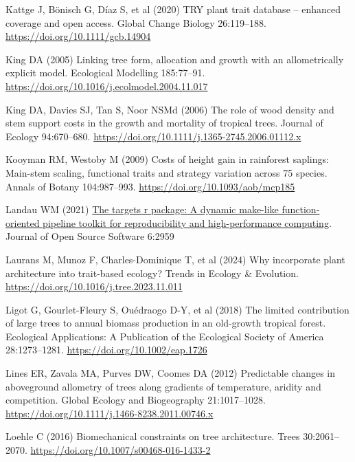 \documentclass[
  12pt,
  letterpaper,
  DIV=11,
  numbers=noendperiod]{scrartcl}
\newlength{\cslhangindent}
\newlength{\cslentryspacingunit} %
\newenvironment{CSLReferences}[2] %
 {%
  \setlength{\parindent}{0pt}
  \ifodd #1
  \let\oldpar\par
  \def\par{\hangindent=\cslhangindent\oldpar}
  \fi
  \setlength{\parskip}{#2\cslentryspacingunit}
 }%
 {}
\begin{document}
\begin{CSLReferences}{1}{0}
\leavevmode{}%
Kattge J, Bönisch G, Díaz S, et al (2020) {TRY} plant trait database --
enhanced coverage and open access. Global Change Biology 26:119--188.
\url{https://doi.org/10.1111/gcb.14904}

\leavevmode{}%
King DA (2005) Linking tree form, allocation and growth with an
allometrically explicit model. Ecological Modelling 185:77--91.
\url{https://doi.org/10.1016/j.ecolmodel.2004.11.017}

\leavevmode{}%
King DA, Davies SJ, Tan S, Noor NSMd (2006) The role of wood density and
stem support costs in the growth and mortality of tropical trees.
Journal of Ecology 94:670--680.
\url{https://doi.org/10.1111/j.1365-2745.2006.01112.x}

\leavevmode{}%
Kooyman RM, Westoby M (2009) Costs of height gain in rainforest
saplings: Main-stem scaling, functional traits and strategy variation
across 75 species. Annals of Botany 104:987--993.
\url{https://doi.org/10.1093/aob/mcp185}

\leavevmode{}%
Landau WM (2021) \href{https://doi.org/10.21105/joss.02959}{The targets
r package: A dynamic make-like function-oriented pipeline toolkit for
reproducibility and high-performance computing}. Journal of Open Source
Software 6:2959

\leavevmode{}%
Laurans M, Munoz F, Charles-Dominique T, et al (2024) Why incorporate
plant architecture into trait-based ecology? Trends in Ecology \&
Evolution. \url{https://doi.org/10.1016/j.tree.2023.11.011}

\leavevmode{}%
Ligot G, Gourlet-Fleury S, Ouédraogo D-Y, et al (2018) The limited
contribution of large trees to annual biomass production in an
old-growth tropical forest. Ecological Applications: A Publication of
the Ecological Society of America 28:1273--1281.
\url{https://doi.org/10.1002/eap.1726}

\leavevmode{}%
Lines ER, Zavala MA, Purves DW, Coomes DA (2012) Predictable changes in
aboveground allometry of trees along gradients of temperature, aridity
and competition. Global Ecology and Biogeography 21:1017--1028.
\url{https://doi.org/10.1111/j.1466-8238.2011.00746.x}

\leavevmode{}%
Loehle C (2016) Biomechanical constraints on tree architecture. Trees
30:2061--2070. \url{https://doi.org/10.1007/s00468-016-1433-2}


\end{CSLReferences}
\end{document}
